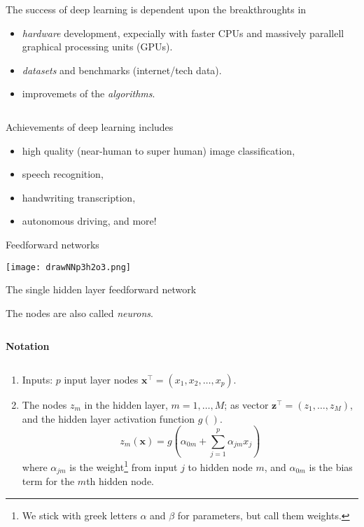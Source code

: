\documentclass[
  10pt,
  ignorenonframetext,
]{beamer}
\providecommand{\tightlist}{%
  \setlength{\itemsep}{0pt}\setlength{\parskip}{0pt}}
\begin{document}
\begin{frame}
The success of deep learning is dependent upon the breakthroughts in

\begin{itemize}
\tightlist
\item
  \emph{hardware} development, expecially with faster CPUs and massively
  parallell graphical processing units (GPUs).
\item
  \emph{datasets} and benchmarks (internet/tech data).
\item
  improvemets of the \emph{algorithms}.
\end{itemize}

\(~\)

Achievements of deep learning includes

\begin{itemize}
\tightlist
\item
  high quality (near-human to super human) image classification,
\item
  speech recognition,
\item
  handwriting transcription,
\item
  autonomous driving, and more!
\end{itemize}
\end{frame}

\begin{frame}{Feedforward networks}
\protect\hypertarget{feedforward-networks}{}
\centering

\texttt{[image: drawNNp3h2o3.png]}
\end{frame}

\begin{frame}
\begin{block}{The single hidden layer feedforward network}
\protect\hypertarget{the-single-hidden-layer-feedforward-network}{}
\(~\)

The nodes are also called \emph{neurons}.

\(~\)

\textbf{Notation}

\(~\)

\begin{enumerate}
\tightlist
\item
  Inputs: \(p\) input layer nodes
  \({\boldsymbol{x}^\top} = (x_1, x_2, \ldots, x_p)\).
\item
  The nodes \(z_m\) in the hidden layer, \(m=1,\ldots, M\); as vector
  \({\boldsymbol z}^\top=(z_1, \ldots, z_M)\), and the hidden layer
  activation function \(g()\). \[
  z_m({\boldsymbol x})=g(\alpha_{0m}+\sum_{j=1}^p \alpha_{jm}x_{j})
  \] where \(\alpha_{jm}\) is the
  weight\footnote{We stick with greek letters $\alpha$ and $\beta$ for parameters, but call them weights.}
  from input \(j\) to hidden node \(m\), and \(\alpha_{0m}\) is the bias
  term for the \(m\)th hidden node.
\end{enumerate}
\end{block}
\end{frame}
\end{document}

